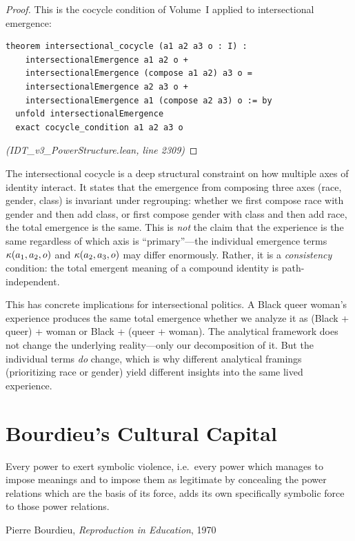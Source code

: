 \begin{proof}
This is the cocycle condition of Volume~I applied to intersectional emergence:
\begin{lstlisting}
theorem intersectional_cocycle (a1 a2 a3 o : I) :
    intersectionalEmergence a1 a2 o +
    intersectionalEmergence (compose a1 a2) a3 o =
    intersectionalEmergence a2 a3 o +
    intersectionalEmergence a1 (compose a2 a3) o := by
  unfold intersectionalEmergence
  exact cocycle_condition a1 a2 a3 o
\end{lstlisting}
\textit{(IDT\_v3\_PowerStructure.lean, line 2309)}
\end{proof}

\begin{interpretation}
The intersectional cocycle is a deep structural constraint on how multiple axes
of identity interact. It states that the emergence from composing three axes
(race, gender, class) is invariant under regrouping: whether we first compose
race with gender and then add class, or first compose gender with class and then
add race, the total emergence is the same. This is \emph{not} the claim that
the experience is the same regardless of which axis is ``primary''---the
individual emergence terms $\kappa(a_1, a_2, o)$ and $\kappa(a_2, a_3, o)$
may differ enormously. Rather, it is a \emph{consistency} condition: the
total emergent meaning of a compound identity is path-independent.

This has concrete implications for intersectional politics. A Black queer
woman's experience produces the same total emergence whether we analyze it as
(Black + queer) + woman or Black + (queer + woman). The analytical framework
does not change the underlying reality---only our decomposition of it.
But the individual terms \emph{do} change, which is why different analytical
framings (prioritizing race or gender) yield different insights into the
same lived experience.
\end{interpretation}


\chapter{Bourdieu's Cultural Capital}
\label{ch:bourdieu}

\epigraph{Every power to exert symbolic violence, i.e.\ every power which manages to impose meanings and to impose them as legitimate by concealing the power relations which are the basis of its force, adds its own specifically symbolic force to those power relations.}{Pierre Bourdieu, \textit{Reproduction in Education}, 1970}

